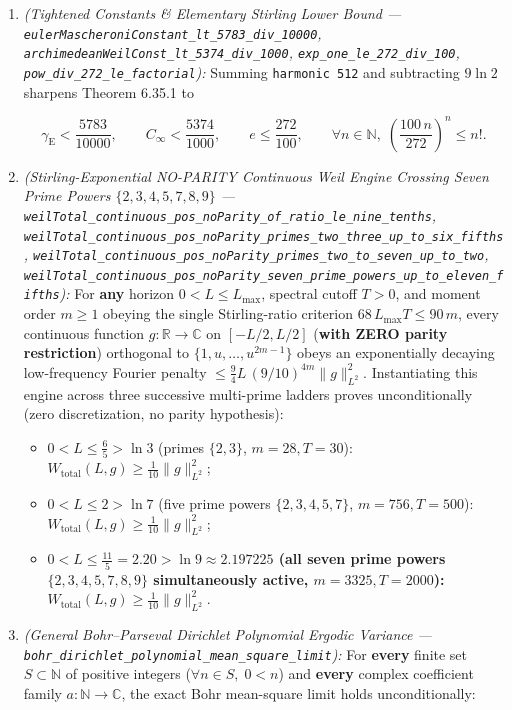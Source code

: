\documentclass[
  11pt,
]{article}
\providecommand{\tightlist}{%
  \setlength{\itemsep}{0pt}\setlength{\parskip}{0pt}}
\begin{document}
\begin{enumerate}
\def\labelenumi{\arabic{enumi}.}
\item
  \emph{(Tightened Constants \& Elementary Stirling Lower Bound ---
  \texttt{eulerMascheroniConstant\_lt\_5783\_div\_10000},
  \texttt{archimedeanWeilConst\_lt\_5374\_div\_1000},
  \texttt{exp\_one\_le\_272\_div\_100},
  \texttt{pow\_div\_272\_le\_factorial}):} Summing
  \texttt{harmonic\ 512} and subtracting \(9\ln 2\) sharpens Theorem
  6.35.1 to

  \[\gamma_{\text{E}} < \frac{5783}{10000}, \qquad C_\infty < \frac{5374}{1000}, \qquad e \le \frac{272}{100}, \qquad \forall n \in \mathbb{N},\; \left(\frac{100\,n}{272}\right)^n \le n!.\]
\item
  \emph{(Stirling-Exponential NO-PARITY Continuous Weil Engine Crossing
  Seven Prime Powers \(\{2, 3, 4, 5, 7, 8, 9\}\) ---
  \texttt{weilTotal\_continuous\_pos\_noParity\_of\_ratio\_le\_nine\_tenths},
  \texttt{weilTotal\_continuous\_pos\_noParity\_primes\_two\_three\_up\_to\_six\_fifths},
  \texttt{weilTotal\_continuous\_pos\_noParity\_primes\_two\_to\_seven\_up\_to\_two},
  \texttt{weilTotal\_continuous\_pos\_noParity\_seven\_prime\_powers\_up\_to\_eleven\_fifths}):}
  For \textbf{any} horizon \(0 < L \le L_{\max}\), spectral cutoff
  \(T > 0\), and moment order \(m \ge 1\) obeying the single
  Stirling-ratio criterion \(68\,L_{\max} T \le 90\,m\), every
  continuous function \(g : \mathbb{R} \to \mathbb{C}\) on
  \([-L/2, L/2]\) (\textbf{with ZERO parity restriction}) orthogonal to
  \(\{1, u, \dots, u^{2m-1}\}\) obeys an exponentially decaying
  low-frequency Fourier penalty
  \(\le \frac{9}{4}L\,(9/10)^{4m}\|g\|_{L^2}^2\). Instantiating this
  engine across three successive multi-prime ladders proves
  unconditionally (zero discretization, no parity hypothesis):

  \begin{itemize}
  \tightlist
  \item
    \(0 < L \le \frac{6}{5} > \ln 3\) (primes \(\{2, 3\}\),
    \(m = 28, T = 30\)):
    \(W_{\text{total}}(L, g) \ge \frac{1}{10}\|g\|_{L^2}^2\);
  \item
    \(0 < L \le 2 > \ln 7\) (five prime powers \(\{2, 3, 4, 5, 7\}\),
    \(m = 756, T = 500\)):
    \(W_{\text{total}}(L, g) \ge \frac{1}{10}\|g\|_{L^2}^2\);
  \item
    \textbf{\(0 < L \le \frac{11}{5} = 2.20 > \ln 9 \approx 2.197225\)
    (all seven prime powers \(\{2, 3, 4, 5, 7, 8, 9\}\) simultaneously
    active, \(m = 3325, T = 2000\)):}
    \(W_{\text{total}}(L, g) \ge \frac{1}{10}\|g\|_{L^2}^2\).
  \end{itemize}
\item
  \emph{(General Bohr--Parseval Dirichlet Polynomial Ergodic Variance
  --- \texttt{bohr\_dirichlet\_polynomial\_mean\_square\_limit}):} For
  \textbf{every} finite set \(S \subset \mathbb{N}\) of positive
  integers (\(\forall n \in S,\; 0 < n\)) and \textbf{every} complex
  coefficient family \(a : \mathbb{N} \to \mathbb{C}\), the exact Bohr
  mean-square limit holds unconditionally:


\end{enumerate}
\end{document}
